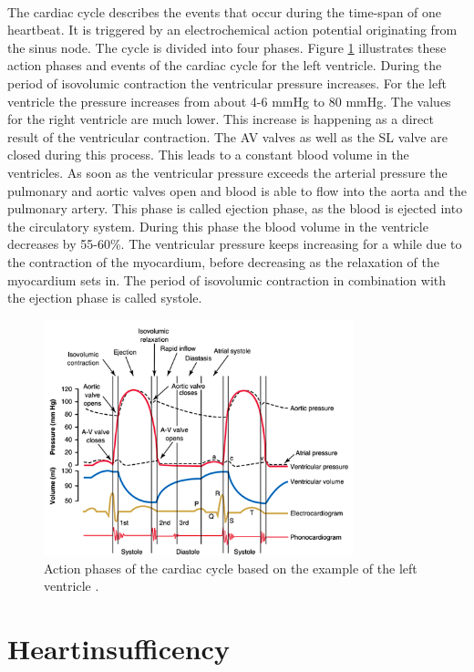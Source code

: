 \\The cardiac cycle describes the events that occur during the time-span of one heartbeat. It is triggered by an electrochemical action potential originating from the sinus node. The cycle is divided into four phases. Figure \ref{fig:cardiac_cycle} illustrates these action phases and events of the cardiac cycle for the left ventricle. During the period of isovolumic contraction the  ventricular pressure increases. For the left ventricle the pressure increases from about 4-6 mmHg to 80 mmHg. The values for the right ventricle are much lower. This increase is happening as a direct result of the ventricular contraction. The AV valves as well as the SL valve are closed during this process. This leads to a constant blood volume in the ventricles. As soon as the ventricular pressure exceeds the arterial pressure the pulmonary and aortic valves open and blood is able to flow into the aorta and the pulmonary artery. This phase is called ejection phase, as the blood is ejected into the circulatory system. During this phase the blood volume in the ventricle decreases by 55-60\%. The ventricular pressure keeps increasing for a while due to the contraction of the myocardium, before decreasing as the relaxation of the myocardium sets in. The period of isovolumic contraction in combination with the ejection phase is called systole. 
\begin{figure}[h]
  \centering
  \includegraphics[width=0.8\textwidth]{images/cardiac_cycle.jpg}
  \caption{Action phases of the cardiac cycle based on the example of the left ventricle \cite{GH20}.}
  \label{fig:cardiac_cycle}
\end{figure}
\section{Heartinsufficency}
